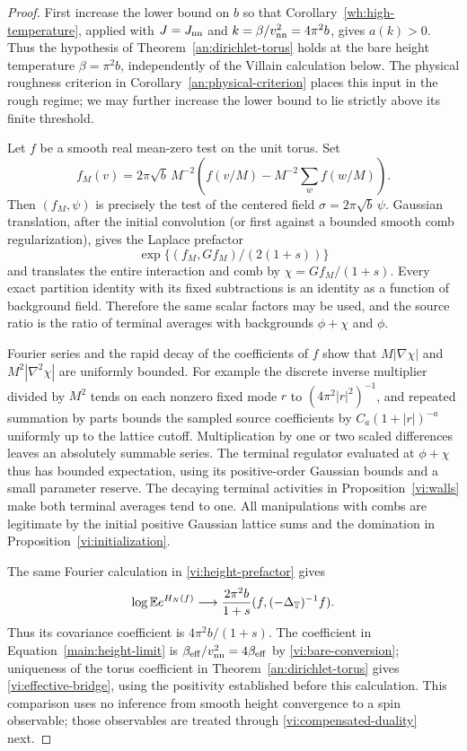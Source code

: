 \begin{proof}
First increase the lower bound on $b$ so that
Corollary~\ref{wh:high-temperature}, applied with $J=J_{\mathrm{nn}}$ and
$k=\beta/v_{\mathrm{nn}}^2=4\pi^2b$, gives $a(k)>0$.
Thus the hypothesis of Theorem~\ref{an:dirichlet-torus} holds at the
bare height temperature $\beta=\pi^2b$, independently of the Villain
calculation below.  The physical roughness criterion in
Corollary~\ref{an:physical-criterion} places this input in the rough regime;
we may further increase the lower bound to lie strictly above its finite
threshold.

Let $f$ be a smooth real mean-zero test on the unit torus.  Set
\[
 f_M(v)=2\pi\sqrt b\,M^{-2}
 \left(f(v/M)-M^{-2}\sum_w f(w/M)\right).
\]
Then $(f_M,\psi)$ is precisely the test of the centered field
$\sigma=2\pi\sqrt b\,\psi$.  Gaussian translation, after the initial
convolution (or first against a bounded smooth comb regularization),
gives the Laplace prefactor
\begin{equation}
 \exp\{(f_M,Gf_M)/(2(1+s))\}                         \label{vi:height-prefactor}
\end{equation}
and translates the entire interaction and comb by
$\chi=Gf_M/(1+s)$.  Every exact partition identity with its fixed
subtractions is an identity as a function of background field.  Therefore
the same scalar factors may be used, and the source ratio is the ratio
of terminal averages with backgrounds $\phi+\chi$ and $\phi$.

Fourier series and the rapid decay of the coefficients of $f$ show that
$M|\nabla\chi|$ and $M^2|\nabla^2\chi|$ are uniformly bounded.
For example the discrete inverse multiplier divided by $M^2$ tends on
each nonzero fixed mode $r$ to $(4\pi^2|r|^2)^{-1}$, and repeated
summation by parts bounds the sampled source coefficients by
$C_a(1+|r|)^{-a}$ uniformly up to the lattice cutoff.  Multiplication by
one or two scaled differences leaves an absolutely summable series.
The terminal regulator evaluated at $\phi+\chi$ thus has bounded
expectation, using its positive-order Gaussian bounds and a small
parameter reserve.  The decaying terminal activities in
Proposition~\ref{vi:walls} make both terminal averages tend to one.
All manipulations with combs are legitimate by the initial positive
Gaussian lattice sums and the domination in
Proposition~\ref{vi:initialization}.

The same Fourier calculation in \eqref{vi:height-prefactor} gives
\[
 \log\mathbb E e^{H_N(f)}\longrightarrow
 \frac{2\pi^2b}{1+s}(f,(-\Delta_\mathbb T)^{-1}f).
\]
Thus its covariance coefficient is $4\pi^2b/(1+s)$.  The coefficient in
Equation~\eqref{main:height-limit} is $\beta_{\mathrm{eff}}/v_{\mathrm{nn}}^2=4\beta_{\mathrm{eff}}$ by
\eqref{vi:bare-conversion}; uniqueness of the torus coefficient in
Theorem~\ref{an:dirichlet-torus} gives
\eqref{vi:effective-bridge}, using the positivity established before
this calculation.  This comparison uses no inference from smooth height
convergence to a spin observable; those observables
are treated through \eqref{vi:compensated-duality} next.
\end{proof}

